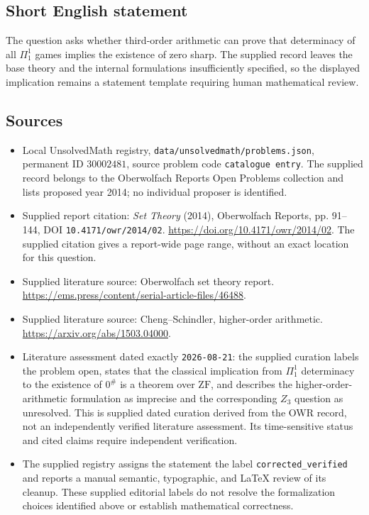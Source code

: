\documentclass[11pt]{article}
\begin{document}
\subsection{Short English statement}
The question asks whether third-order arithmetic can prove that determinacy of all \(\Pi^1_1\) games implies the existence of zero sharp. The supplied record leaves the base theory and the internal formulations insufficiently specified, so the displayed implication remains a statement template requiring human mathematical review.
\subsection{Sources}
\begin{itemize}
\item Local UnsolvedMath registry, \texttt{data/unsolvedmath/problems.json}, permanent ID \(30002481\), source problem code \texttt{catalogue entry}. The supplied record belongs to the Oberwolfach Reports Open Problems collection and lists proposed year 2014; no individual proposer is identified.
\item Supplied report citation: \emph{Set Theory} (2014), Oberwolfach Reports, pp. 91--144, DOI \texttt{10.4171/owr/2014/02}. \url{https://doi.org/10.4171/owr/2014/02}. The supplied citation gives a report-wide page range, without an exact location for this question.
\item Supplied literature source: Oberwolfach set theory report. \url{https://ems.press/content/serial-article-files/46488}.
\item Supplied literature source: Cheng--Schindler, higher-order arithmetic. \url{https://arxiv.org/abs/1503.04000}.
\item Literature assessment dated exactly \texttt{2026-08-21}: the supplied curation labels the problem open, states that the classical implication from \(\Pi^1_1\) determinacy to the existence of \(0^{\#}\) is a theorem over \(\mathrm{ZF}\), and describes the higher-order-arithmetic formulation as imprecise and the corresponding \(Z_3\) question as unresolved. This is supplied dated curation derived from the OWR record, not an independently verified literature assessment. Its time-sensitive status and cited claims require independent verification.
\item The supplied registry assigns the statement the label \texttt{corrected\_verified} and reports a manual semantic, typographic, and LaTeX review of its cleanup. These supplied editorial labels do not resolve the formalization choices identified above or establish mathematical correctness.
\end{itemize}
\end{document}
